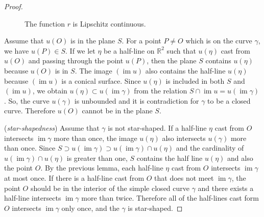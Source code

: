 \documentclass{amsart}
\theoremstyle{plain}
\theoremstyle{definition}
\theoremstyle{remark}
\DeclareMathOperator{\im}{im}
\begin{document}
\begin{proof}
\begin{figure}%
\caption{The function $r$ is Lipschitz continuous.}
\end{figure}



Assume that $u(O)$ is in the plane $S$.
For a point $P\ne O$ which is on the curve $\gamma$, we have $u(P)\in S$.
If we let $\eta$ be a half-line on $\mathbb{R}^2$ such that $u(\eta)$ cast from $u(O)$ and passing through the point $u(P)$, then the plane $S$ contains $u(\eta)$ because $u(O)$ is in $S$.
The image $(\im u)$ also contains the half-line $u(\eta)$ because $(\im u)$ is a conical surface.
Since $u(\eta)$ is included in both $S$ and $(\im u)$, we obtain $u(\eta)\subset u(\im\gamma)$ from the relation $S\cap\im u=u(\im \gamma)$.
So, the curve $u(\gamma)$ is unbounded and it is contradiction for $\gamma$ to be a closed curve.
Therefore $u(O)$ cannot be in the plane $S$.

(\emph{star-shapedness})
Assume that $\gamma$ is not star-shaped.
If a half-line $\eta$ cast from $O$ intersects $\im\gamma$ more than once, the image $u(\eta)$ also intersects $u(\gamma)$ more than once.
Since $S\supset u(\im\gamma)\supset u(\im\gamma)\cap u(\eta)$ and the cardinality of $u(\im\gamma)\cap u(\eta)$ is greater than one, $S$ contains the half line $u(\eta)$ and also the point $O$.
By the previous lemma, each half-line $\eta$ cast from $O$ intersects $\im\gamma$ at most once.
If there is a half-line cast from $O$ that does not meet $\im\gamma$, the point $O$ should be in the interior of the simple closed curve $\gamma$ and there exists a half-line intersects $\im\gamma$ more than twice.
Therefore all of the half-lines cast form $O$ intersects $\im\gamma$ only once, and the $\gamma$ is star-shaped.


\end{proof}
\end{document}
